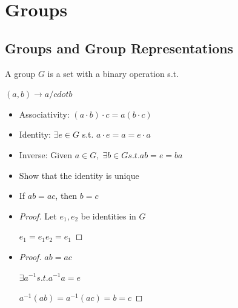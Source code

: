 \section{Groups}
\subsection{Groups and Group Representations}

\begin{definition}
    A group $G$ is a set with a binary operation s.t.

    $(a,b) \rightarrow a/cdot b$
    \begin{itemize}
        \item Associativity: $(a\cdot b)\cdot c = a(b \cdot c)$
        \item Identity: $\exists e \in G$ s.t. $a\cdot e = a = e \cdot a$
        \item Inverse: Given $a \in G, \; \exists b\in G s.t. ab=e=ba$
    \end{itemize}
\end{definition}

\begin{example}
    \begin{itemize}
        \item Show that the identity is unique
        \item If $ab=ac$, then $b=c$
    \end{itemize}
\end{example}

\begin{itemize}
    \item \begin{proof}
        Let $e_1,e_2$ be identities in $G$

        $e_1 = e_1e_2 = e_1$
    \end{proof}
    \item \begin{proof}
        $ab=ac$

        $\exists a^{-1} s.t. a^{-1}a=e$

        $a^{-1}(ab)=a^{-1}(ac) = b = c$
    \end{proof}
\end{itemize}

